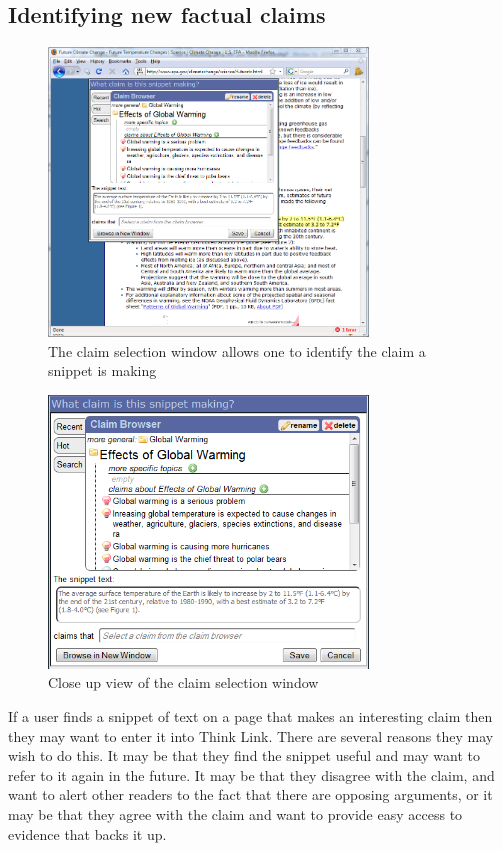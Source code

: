 \documentclass{chi2009}
\begin{document}
\subsection{Identifying new factual claims}

\begin{figure}[t]
	\includegraphics[width=8.5cm]{../screenshots/snipsave_full.png}
	\caption{The claim selection window allows one to identify the claim a snippet is making}
	\label{snipsavefull}
\end{figure}

\begin{figure}[t]
	\includegraphics[width=8.5cm]{../screenshots/snipsave_crop.png}
	\caption{Close up view of the claim selection window}
	\label{snipsavecrop}
\end{figure}


If a user finds a snippet of text on a page that makes an interesting claim then they may want to enter it into Think Link. There are several reasons they may wish to do this. It may be that they find the snippet useful and may want to refer to it again in the future. It may be that they disagree with the claim, and want to alert other readers to the fact that there are opposing arguments, or it may be that they agree with the claim and want to provide easy access to evidence that backs it up. 
\end{document}
